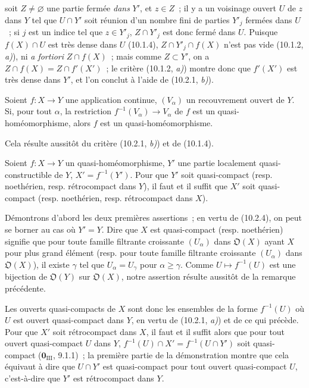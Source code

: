 soit $Z\neq\varnothing$ une partie fermée \emph{dans} $Y'$, et $z\in Z$~; il
y a un voisinage ouvert $U$ de $z$ dans $Y$ tel que $U\cap Y'$ soit réunion
d'un nombre fini de parties $Y'_j$ fermées dans $U$~; si $j$ est un indice tel
que $z\in Y'_j$, $Z\cap Y'_j$ est donc fermé dans $U$. Puisque $f(X)\cap U$
est très dense dans $U$ (10.1.4), $Z\cap Y'_j\cap f(X)$ n'est pas vide
(10.1.2, \emph{a)}), ni \emph{a fortiori} $Z\cap f(X)$~; mais comme
$Z\subset Y'$, on a $Z\cap f(X)=Z\cap f'(X')$~; le critère
(10.1.2, \emph{a)}) montre donc que $f'(X')$ est très dense dans $Y'$, et
l'on conclut à l'aide de (10.2.1, \emph{b)}).

\begin{corollary}[10.2.5]
\label{IV.10.2.5-fr}
Soient $f:X\to Y$ une application continue, $(V_\alpha)$ un recouvrement
ouvert de $Y$. Si, pour tout $\alpha$, la restriction
$f^{-1}(V_\alpha)\to V_\alpha$ de $f$ est un quasi-homéomorphisme, alors $f$
est un quasi-homéomorphisme.
\end{corollary}

Cela résulte aussitôt du critère (10.2.1, \emph{b)}) et de (10.1.4).

\begin{corollary}[10.2.6]
\label{IV.10.2.6-fr}
Soient $f:X\to Y$ un quasi-homéomorphisme, $Y'$ une partie localement
quasi-constructible de $Y$, $X'=f^{-1}(Y')$. Pour que $Y'$ soit quasi-compact
(resp. noethérien, resp. rétrocompact dans $Y$), il faut et il suffit que $X'$
soit quasi-compact (resp. noethérien, resp. rétrocompact dans $X$).
\end{corollary}

Démontrons d'abord les deux premières assertions~; en vertu de (10.2.4), on
peut se borner au cas où $Y'=Y$. Dire que $X$ est quasi-compact (resp.
noethérien) signifie que pour toute famille filtrante croissante $(U_\alpha)$
dans $\mathfrak O(X)$ ayant $X$ pour plus grand élément (resp. pour toute
famille filtrante croissante $(U_\alpha)$ dans $\mathfrak O(X)$), il existe
$\gamma$ tel que $U_\alpha=U_\gamma$ pour $\alpha\geq\gamma$. Comme
$U\mapsto f^{-1}(U)$ est une bijection de $\mathfrak O(Y)$ sur
$\mathfrak O(X)$, notre assertion résulte aussitôt de la remarque précédente.

Les ouverts quasi-compacts de $X$ sont donc les ensembles de la forme
$f^{-1}(U)$ où $U$ est ouvert quasi-compact dans $Y$, en vertu de
(10.2.1, \emph{a)}) et de ce qui précède. Pour que $X'$ soit rétrocompact dans
$X$, il faut et il suffit alors que pour tout ouvert quasi-compact $U$ dans
$Y$, $f^{-1}(U)\cap X'=f^{-1}(U\cap Y')$ soit quasi-compact
($\mathbf 0_{\mathrm{III}}$, 9.1.1)~; la première partie de la démonstration
montre que cela équivaut à dire que $U\cap Y'$ est quasi-compact pour tout
ouvert quasi-compact $U$, c'est-à-dire que $Y'$ est rétrocompact dans $Y$.

